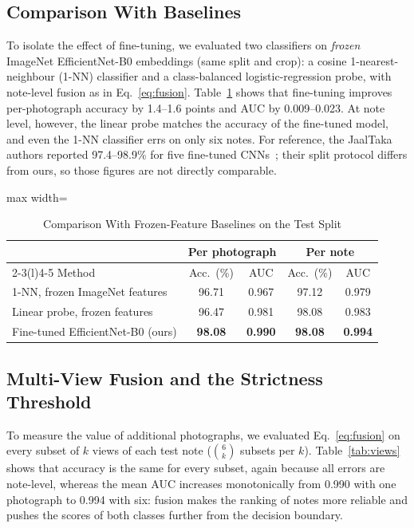 \documentclass[journal]{IEEEtran}
\begin{document}
\subsection{Comparison With Baselines}
\label{sec:baselines}
To isolate the effect of fine-tuning, we evaluated two classifiers on \emph{frozen}
ImageNet EfficientNet-B0 embeddings (same split and crop): a cosine 1-nearest-neighbour
(1-NN) classifier and a class-balanced logistic-regression probe, with note-level
fusion as in Eq.~\eqref{eq:fusion}. Table~\ref{tab:baselines} shows that
fine-tuning improves per-photograph accuracy by 1.4--1.6 points and AUC by 0.009--0.023.
At note level, however, the linear probe matches the accuracy of the fine-tuned model,
and even the 1-NN classifier errs on only six notes. For reference, the JaalTaka
authors reported 97.4--98.9\% for five fine-tuned CNNs~\cite{piyas2025jaaltaka}; their
split protocol differs from ours, so those figures are not directly comparable.

\begin{table}[!t]
\caption{Comparison With Frozen-Feature Baselines on the Test Split}
\label{tab:baselines}
\centering
\footnotesize
\setlength{\tabcolsep}{4pt}
\begin{adjustbox}{max width=\columnwidth}
\begin{tabular}{@{}lcccc@{}}
\toprule
& \multicolumn{2}{c}{Per photograph} & \multicolumn{2}{c}{Per note} \\
\cmidrule(lr){2-3}\cmidrule(l){4-5}
Method & Acc.\ (\%) & AUC & Acc.\ (\%) & AUC \\
\midrule
1-NN, frozen ImageNet features & 96.71 & 0.967 & 97.12 & 0.979 \\
Linear probe, frozen features  & 96.47 & 0.981 & 98.08 & 0.983 \\
Fine-tuned EfficientNet-B0 (ours) & \textbf{98.08} & \textbf{0.990} & \textbf{98.08} & \textbf{0.994} \\
\bottomrule
\end{tabular}
\end{adjustbox}
\end{table}

\subsection{Multi-View Fusion and the Strictness Threshold}
To measure the value of additional photographs, we evaluated Eq.~\eqref{eq:fusion} on
every subset of $k$ views of each test note ($\binom{6}{k}$ subsets per $k$).
Table~\ref{tab:views} shows that accuracy is the same for every subset, again because
all errors are note-level, whereas the mean AUC increases monotonically from 0.990 with
one photograph to 0.994 with six: fusion makes the ranking of notes more reliable and
pushes the scores of both classes further from the decision boundary.
\end{document}
